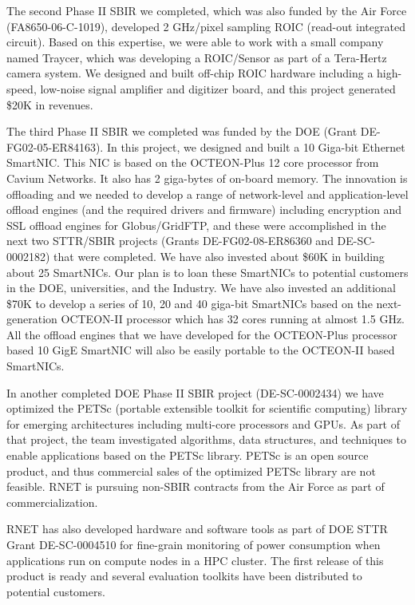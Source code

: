 The second Phase II SBIR we completed, which was also funded by the
Air Force (FA8650-06-C-1019), developed 2 GHz/pixel sampling ROIC
(read-out integrated circuit). Based on this expertise, we were able
to work with a small company named Traycer, which was developing a
ROIC/Sensor as part of a Tera-Hertz camera system. We designed and
built off-chip ROIC hardware including a high-speed, low-noise signal
amplifier and digitizer board, and this project generated \$20K in
revenues. 

The third Phase II SBIR we completed was funded by the DOE (Grant
DE-FG02-05-ER84163). In this project, we designed and built a 10
Giga-bit Ethernet SmartNIC. This NIC is based on the OCTEON-Plus 12
core processor from Cavium Networks. It also has 2 giga-bytes of
on-board memory. The innovation is offloading and we needed to
develop a range of network-level and application-level offload engines
(and the required drivers and firmware) including encryption and SSL
offload engines for Globus/GridFTP, and these were accomplished in the
next two STTR/SBIR projects (Grants DE-FG02-08-ER86360 and
DE-SC-0002182) that were completed. 
We have also
invested about \$60K in building about 25 SmartNICs. Our plan is to
loan these SmartNICs to potential customers in the DOE,
universities, and the Industry. We have also invested an additional
\$70K to develop a series of 10, 20 and 40 giga-bit SmartNICs based on
the next-generation OCTEON-II processor which has 32 cores running at
almost 1.5 GHz. All the offload engines that we have developed for the
OCTEON-Plus processor based 10 GigE SmartNIC will also be easily
portable to the OCTEON-II based SmartNICs.

In another  completed DOE Phase II SBIR project
(DE-SC-0002434) we have optimized the PETSc (portable extensible
toolkit for scientific computing) library for emerging architectures
including multi-core processors and GPUs. As part of that project, the
team investigated algorithms, data structures, and techniques to
enable applications based on the PETSc library. PETSc is an open
source product, and thus commercial sales of the optimized PETSc
library are not feasible.  RNET is  pursuing non-SBIR contracts
from the Air Force as part of commercialization.

RNET has also developed hardware and software tools as part of DOE
STTR Grant DE-SC-0004510 for fine-grain monitoring of power
consumption when applications run on compute nodes in a HPC
cluster. The first release of this product is ready and several evaluation
toolkits have been distributed to potential customers. 

